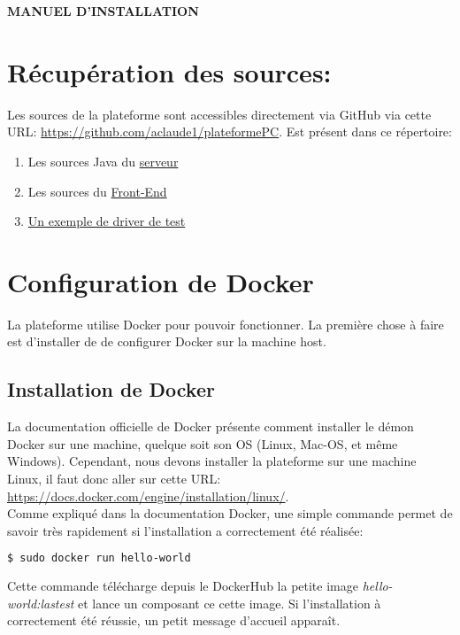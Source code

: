\documentclass[a4paper]{article}
\begin{document}
\begin{center}
\textsc{\LARGE{\textbf{MANUEL D'INSTALLATION}}}\\[2cm]
\end{center}

\section{Récupération des sources:}
Les sources de la plateforme sont accessibles directement via GitHub via cette URL: \url{https://github.com/aclaude1/plateformePC}. Est présent dans ce répertoire:
\begin{enumerate}
\item Les sources Java du \href{https://github.com/aclaude1/plateformePC/tree/master/src/main/java/io/vertx/blog/plateforme}{serveur}
\item Les sources du \href{https://github.com/aclaude1/plateformePC/tree/master/ressources}{Front-End}
\item \href{https://github.com/aclaude1/plateformePC/tree/master/Exemple_HelloWorld}{Un exemple de driver de test}
\end{enumerate}

\section{Configuration de Docker}
La plateforme utilise Docker pour pouvoir fonctionner. La première chose à faire est d'installer de de configurer Docker sur la machine host.
\subsection{Installation de Docker}
La documentation officielle de Docker présente comment installer le démon Docker sur une machine, quelque soit son OS (Linux, Mac-OS, et même Windows). Cependant, nous devons installer la plateforme sur une machine Linux, il faut donc aller sur cette URL: \url{https://docs.docker.com/engine/installation/linux/}. \\
Comme expliqué dans la documentation Docker, une simple commande permet de savoir très rapidement si l'installation a correctement été réalisée:
\begin{lstlisting}[language=bash]
  $ sudo docker run hello-world
\end{lstlisting}
Cette commande télécharge depuis le DockerHub la petite image \textit{hello-world:lastest} et lance un composant ce cette image. Si l'installation à correctement été réussie, un petit message d'accueil apparaît.
\end{document}
